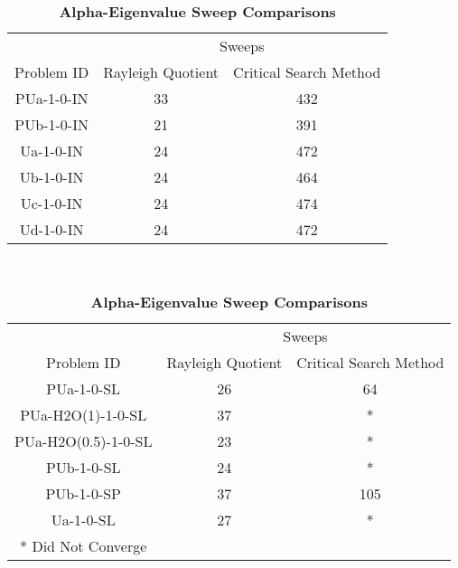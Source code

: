 \begin{table}[]
    \centering
    \caption{\textbf{Alpha-Eigenvalue Sweep Comparisons}}
    \label{table:alph}
    \begin{subtable}{\linewidth}
    \centering
    \begin{tabular}{*3c}
        \toprule
        & \multicolumn{2}{c}{Sweeps} \\
        \cmidrule(lr){2-3}
        Problem ID & Rayleigh Quotient & Critical Search Method\\    
        \midrule
        PUa-1-0-IN & 33 & 432 \\
        PUb-1-0-IN & 21 & 391   \\
	Ua-1-0-IN & 24 & 472\\
	Ub-1-0-IN & 24 & 464 \\
	Uc-1-0-IN & 24 & 474 \\
	Ud-1-0-IN & 24 & 472\\
        \bottomrule
    \end{tabular}
    \end{subtable} \\
    \centering
    \begin{subtable}{\linewidth}
    \centering
    \begin{tabular}{*3c}
        \toprule
        & \multicolumn{2}{c}{Sweeps} \\
        \cmidrule(lr){2-3}
        Problem ID & Rayleigh Quotient & Critical Search Method \\    
        \midrule
        PUa-1-0-SL & 26 & 64 \\
	\small PUa-H2O(1)-1-0-SL & 37 & *      \\
	\small PUa-H2O(0.5)-1-0-SL & 23 & *    \\
	PUb-1-0-SL & 24 & * \\
        PUb-1-0-SP & 37 & 105 \\
	Ua-1-0-SL & 27 & * \\
        \bottomrule
	* Did Not Converge & &
    \end{tabular}
    \end{subtable}
\end{table}

%		
%		

